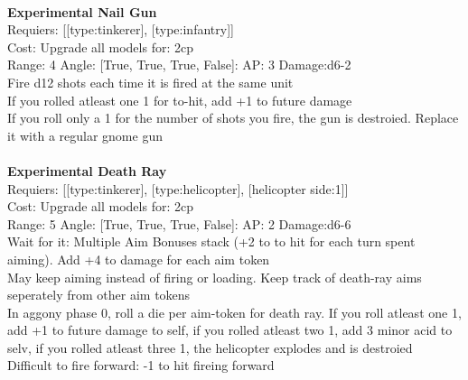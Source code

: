 \ \\
{\bf Experimental Nail Gun } \\

Requiers: [[type:tinkerer], [type:infantry]] \\
Cost: Upgrade all models for: 2cp \\


Range: 4  Angle: [True, True, True, False]: AP: 3 Damage:d6-2 \\
Fire d12 shots each time it is fired at the same unit\\ 
If you rolled atleast one 1 for to-hit, add +1 to future damage\\ 
If you roll only a 1 for the number of shots you fire, the gun is destroied. Replace it with a regular gnome gun\\ 








\ \\
{\bf Experimental Death Ray } \\

Requiers: [[type:tinkerer], [type:helicopter], [helicopter side:1]] \\
Cost: Upgrade all models for: 2cp \\


Range: 5  Angle: [True, True, True, False]: AP: 2 Damage:d6-6 \\
Wait for it: Multiple Aim Bonuses stack (+2 to to hit for each turn spent aiming). Add +4 to damage for each aim token\\ 
May keep aiming instead of firing or loading. Keep track of death-ray aims seperately from other aim tokens\\ 
In aggony phase 0, roll a die per aim-token for death ray. If you roll atleast one 1, add +1 to future damage to self, if you rolled atleast two 1, add 3 minor acid to selv, if you rolled atleast three 1, the helicopter explodes and is destroied\\ 
Difficult to fire forward: -1 to hit fireing forward\\ 








